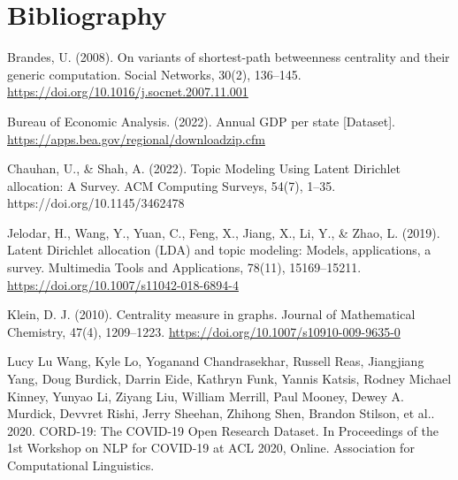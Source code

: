 \documentclass[10pt, a4paper, twocolumn]{article} %
\begin{document}
\hspace{20px}

\hspace{20px}

\hspace{20px}

\hspace{20px}

\hspace{20px}

\hspace{20px}

\hspace{20px}

\pagebreak
\section{Bibliography}

\hspace{5px} Brandes, U. (2008). On variants of shortest-path betweenness centrality and their generic computation. Social Networks, 30(2), 136–145. \url{https://doi.org/10.1016/j.socnet.2007.11.001} \\

\vspace{-13px}

Bureau of Economic Analysis. (2022). Annual GDP per state [Dataset]. \url{https://apps.bea.gov/regional/downloadzip.cfm}

Chauhan, U., \& Shah, A. (2022). Topic Modeling Using Latent Dirichlet allocation: A Survey. ACM Computing Surveys, 54(7), 1–35. https://doi.org/10.1145/3462478

Jelodar, H., Wang, Y., Yuan, C., Feng, X., Jiang, X., Li, Y., \& Zhao, L. (2019). Latent Dirichlet allocation (LDA) and topic modeling: Models, applications, a survey. Multimedia Tools and Applications, 78(11), 15169–15211. \url{https://doi.org/10.1007/s11042-018-6894-4}

Klein, D. J. (2010). Centrality measure in graphs. Journal of Mathematical Chemistry, 47(4), 1209–1223. \url{https://doi.org/10.1007/s10910-009-9635-0}
 
Lucy Lu Wang, Kyle Lo, Yoganand Chandrasekhar, Russell Reas, Jiangjiang Yang, Doug Burdick, Darrin Eide, Kathryn Funk, Yannis Katsis, Rodney Michael Kinney, Yunyao Li, Ziyang Liu, William Merrill, Paul Mooney, Dewey A. Murdick, Devvret Rishi, Jerry Sheehan, Zhihong Shen, Brandon Stilson, et al.. 2020. CORD-19: The COVID-19 Open Research Dataset. In Proceedings of the 1st Workshop on NLP for COVID-19 at ACL 2020, Online. Association for Computational Linguistics.
\end{document}
